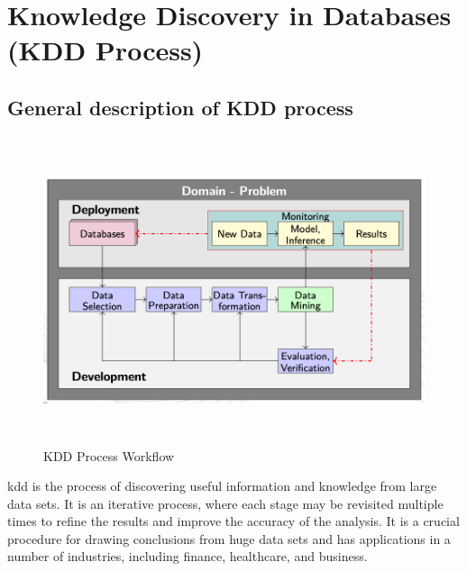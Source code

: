 %
%



\chapter{Knowledge Discovery in Databases (KDD Process)}

\section{General description of KDD process}

\begin{center}
	\begin{figure}[h!]
		\begin{center}
			\includegraphics[height=90mm, width=130mm]{Images/KDDProcess}
		\end{center}
	\caption{ KDD Process Workflow \cite{Wings:2023}}
	\end{figure}
\end{center}

\ac{kdd} is the process of discovering useful information and knowledge from large data sets. It is an iterative process, where each stage may be revisited multiple times to refine the results and improve the accuracy of the analysis. It is a crucial procedure for drawing conclusions from huge data sets and has applications in a number of industries, including finance, healthcare, and business.\bigskip

